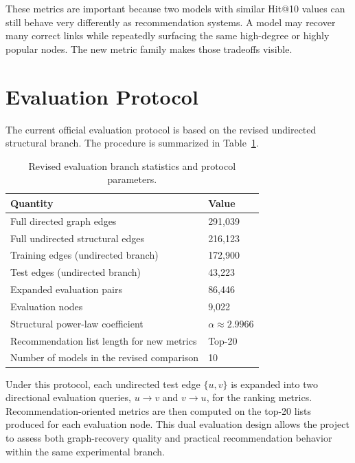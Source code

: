 These metrics are important because two models with similar Hit@10 values can
still behave very differently as recommendation systems. A model may recover
many correct links while repeatedly surfacing the same high-degree or highly
popular nodes. The new metric family makes those tradeoffs visible.

\section{Evaluation Protocol}

The current official evaluation protocol is based on the revised undirected
structural branch. The procedure is summarized in
Table~\ref{tab:eval-branch-stats}.

\begin{table}[H]
\centering
\caption{Revised evaluation branch statistics and protocol parameters.}
\label{tab:eval-branch-stats}
\begin{tabular}{p{}p{}}
\toprule
\textbf{Quantity} & \textbf{Value} \\
\midrule
Full directed graph edges & 291,039 \\
Full undirected structural edges & 216,123 \\
Training edges (undirected branch) & 172,900 \\
Test edges (undirected branch) & 43,223 \\
Expanded evaluation pairs & 86,446 \\
Evaluation nodes & 9,022 \\
Structural power-law coefficient & $\alpha \approx 2.9966$ \\
Recommendation list length for new metrics & Top-20 \\
Number of models in the revised comparison & 10 \\
\bottomrule
\end{tabular}
\end{table}

Under this protocol, each undirected test edge $\{u,v\}$ is expanded into two
directional evaluation queries, $u \rightarrow v$ and $v \rightarrow u$, for the
ranking metrics. Recommendation-oriented metrics are then computed on the top-20
lists produced for each evaluation node. This dual evaluation design allows the
project to assess both graph-recovery quality and practical recommendation
behavior within the same experimental branch.
